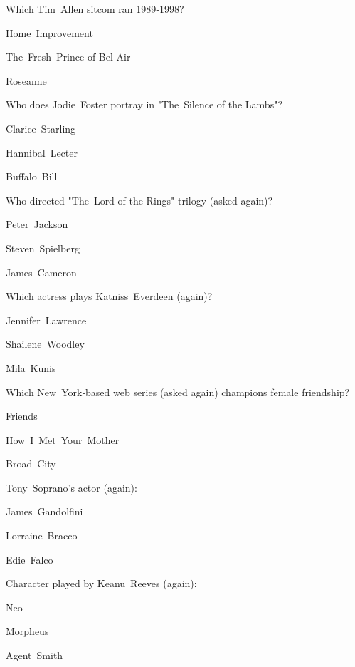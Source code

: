 \begin{enhancedmcq}{Which Tim Allen sitcom ran 1989‑1998?}
\item Home Improvement
\item The Fresh Prince of Bel‑Air
\item Roseanne

\end{enhancedmcq}
\begin{enhancedmcq}{Who does Jodie Foster portray in "The Silence of the Lambs"?}
\item Clarice Starling
\item Hannibal Lecter
\item Buffalo Bill

\end{enhancedmcq}
\begin{enhancedmcq}{Who directed "The Lord of the Rings" trilogy (asked again)?}
\item Peter Jackson
\item Steven Spielberg
\item James Cameron

\end{enhancedmcq}
\begin{enhancedmcq}{Which actress plays Katniss Everdeen (again)?}
\item Jennifer Lawrence
\item Shailene Woodley
\item Mila Kunis

\end{enhancedmcq}
\begin{enhancedmcq}{Which New York‑based web series (asked again) champions female friendship?}
\item Friends
\item How I Met Your Mother
\item Broad City

\end{enhancedmcq}
\begin{enhancedmcq}{Tony Soprano's actor (again):}
\item James Gandolfini
\item Lorraine Bracco
\item Edie Falco

\end{enhancedmcq}
\begin{enhancedmcq}{Character played by Keanu Reeves (again):}
\item Neo
\item Morpheus
\item Agent Smith

\end{enhancedmcq}
